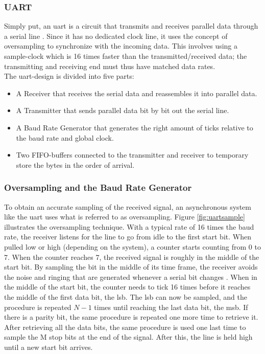\documentclass[main.tex]{subfiles}
\begin{document}
\subsubsection{UART}
Simply put, an \gls{uart} is a circuit that transmits and receives parallel data through a serial line \cite{chu08}. Since it has no dedicated clock line, it uses the concept of oversampling to synchronize with the incoming data. This involves using a sample-clock which is 16 times faster than the transmitted/received data; the transmitting and receiving end must thus have matched data rates.\\

\noindent
The \gls{uart}-design is divided into five parts:
\begin{itemize}
\item A Receiver that receives the serial data and reassembles it into parallel data.
\item A Transmitter that sends parallel data bit by bit out the serial line.
\item A Baud Rate Generator that generates the right amount of ticks relative to the baud rate and global clock.
\item Two FIFO-buffers connected to the transmitter and receiver to temporary store the bytes in the order of arrival.
\end{itemize}

\subsubsection{Oversampling and the Baud Rate Generator}

To obtain an accurate sampling of the received signal, an asynchronous system like the \gls{uart} uses what is referred to as oversampling. Figure \ref{fig:uartsample} illustrates the oversampling technique. With a typical rate of 16 times the baud rate, the receiver listens for the line to go from idle to the first start bit. When pulled low or high (depending on the system), a counter starts counting from 0 to 7. When the counter reaches 7, the received signal is roughly in the middle of the start bit. By sampling the bit in the middle of its time frame, the receiver avoids the noise and ringing that are generated whenever a serial bit changes \cite{rapid08}. When in the middle of the start bit, the counter needs to tick 16 times before it reaches the middle of the first data bit, the \gls{lsb}. The \gls{lsb} can now be sampled, and the procedure is repeated $N - 1$ times until reaching the last data bit, the \acrshort{msb}. If there is a parity bit, the same procedure is repeated one more time to retrieve it. After retrieving all the data bits, the same procedure is used one last time to sample the M stop bits at the end of the signal. After this, the line is held high until a new start bit arrives. 
\end{document}
